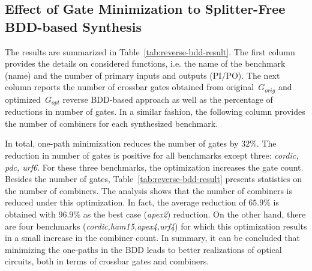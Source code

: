 \documentclass[10pt,letterpaper,twoside,openright]{book}
\begin{document}
\subsection{Effect of Gate Minimization to Splitter-Free BDD-based Synthesis}

The results are summarized in Table~\ref{tab:reverse-bdd-result}. The first column provides the details on considered functions, i.e. the name of the benchmark (name) and the number of primary inputs and outputs (PI/PO). The next column reports the number of crossbar gates obtained from original~$G_{orig}$ and optimized~$G_{opt}$ reverse BDD-based approach as well as the percentage of reductions in number of gates. In a similar fashion, the following column provides the number of combiners for each synthesized benchmark.

In total,  one-path minimization reduces the number of gates by $32\%$. The reduction in number of gates is positive for all benchmarks except three: \emph{cordic, pdc, urf6}. For these three benchmarks, the optimization increases the gate count. Besides the number of gates, Table~\ref{tab:reverse-bdd-result} presents statistics on the number of combiners. The analysis shows that the number of combiners is reduced under this optimization. In fact, the average reduction of $65.9\%$ is obtained with $96.9\%$ as the best case (\emph{apex2}) reduction. On the other hand, there are four benchmarks (\emph{cordic,ham15,apex4,urf4}) for which this optimization results in a small increase in the combiner count. In summary, it can be concluded that minimizing the one-paths in the BDD leads to better realizations of optical circuits, both in terms of crossbar gates and combiners.    
\end{document}
